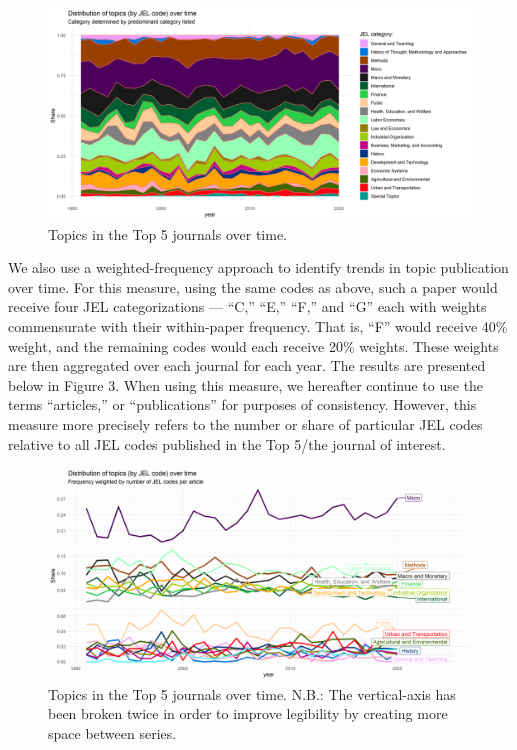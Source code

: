\documentclass[11pt, letterpaper, twoside]{article}
\begin{document}
\begin{figure}[!ht]
    \centering
    \includegraphics[width=\textwidth]{jel_predom_normalized.png}
    \caption{Topics in the Top 5 journals over time.}
\end{figure}




We also use a weighted-frequency approach to identify trends in topic publication over time. For this measure, using the same codes as above, such a paper would receive four JEL categorizations --- ``C,'' ``E,'' ``F,'' and ``G'' each with weights commensurate with their within-paper frequency. That is, ``F'' would receive 40\% weight, and the remaining codes would each receive 20\% weights. These weights are then aggregated over each journal for each year. The results are presented below in Figure 3. When using this measure, we hereafter continue to use the terms ``articles,'' or ``publications'' for purposes of consistency. However, this measure more precisely refers to the number or share of particular JEL codes relative to all JEL codes published in the Top 5/the journal of interest.

\begin{figure}[!ht]
    \centering
    \includegraphics[width=\textwidth]{jel_weighted_normalized_line.png}
    \caption{Topics in the Top 5 journals over time. N.B.: The vertical-axis has been broken twice in order to improve legibility by creating more space between series.}    
\end{figure}
\end{document}
